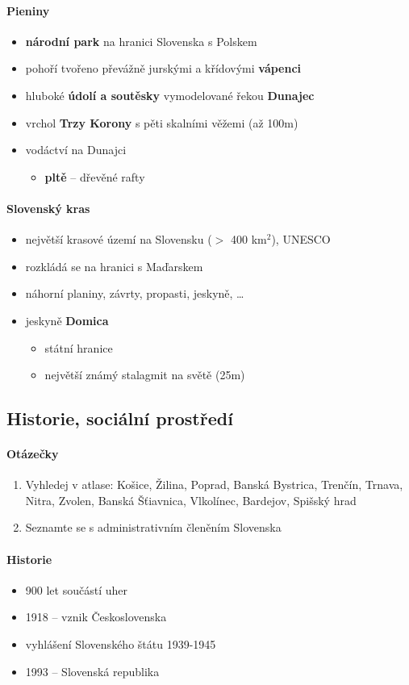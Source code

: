 \documentclass[10pt,a4paper]{article}
\begin{document}
\paragraph{Pieniny}
\begin{itemize}
\item \textbf{národní park} na hranici Slovenska s Polskem
\item pohoří tvořeno převážně jurskými a křídovými \textbf{vápenci}
\item hluboké \textbf{údolí a soutěsky} vymodelované řekou \textbf{Dunajec}
\item vrchol \textbf{Trzy Korony} s pěti skalními věžemi (až 100m)
\item vodáctví na Dunajci
\begin{itemize}
\item \textbf{pltě} -- dřevěné rafty
\end{itemize}
\end{itemize}

\paragraph{Slovenský kras}
\begin{itemize}
\item největší krasové území na Slovensku ($>$ 400 km$^2$), UNESCO
\item rozkládá se na hranici s Maďarskem
\item náhorní planiny, závrty, propasti, jeskyně, \ldots
\item jeskyně \textbf{Domica}
\begin{itemize}
\item státní hranice
\item největší známý stalagmit na světě (25m)
\end{itemize}
\end{itemize}


\subsection{Historie, sociální prostředí}
\paragraph{Otázečky}
\begin{enumerate}
\item Vyhledej v atlase: Košice, Žilina, Poprad, Banská Bystrica, Trenčín, Trnava, Nitra, Zvolen, Banská Šťiavnica, Vlkolínec, Bardejov, Spišský hrad
\item Seznamte se s administrativním členěním Slovenska
\end{enumerate}

\paragraph{Historie}
\begin{itemize}
\item 900 let součástí uher
\item 1918 -- vznik Československa
\item vyhlášení Slovenského štátu 1939-1945
\item 1993 -- Slovenská republika
\end{itemize}
\end{document}
